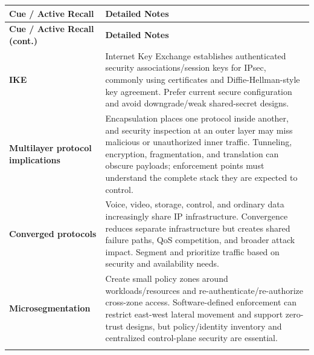 \documentclass[10pt,letterpaper]{article}
\makeatletter
\newenvironment{cornell}{\rowcolors{2}{white}{notebg}\begin{longtable}{@{}>{\raggedright\arraybackslash\columncolor{cuebg}\color{navy}\bfseries}p{0.285\textwidth}>{\raggedright\arraybackslash}p{0.65\textwidth}@{}}\rowcolor{navy}\color{white}\textbf{Cue / Active Recall} & \color{white}\textbf{Detailed Notes}\\ \hline\endfirsthead\rowcolor{navy}\color{white}\textbf{Cue / Active Recall (cont.)} & \color{white}\textbf{Detailed Notes}\\ \hline\endhead}{\end{longtable}}
\newcommand{\noterow}[2]{#1 & #2\\\arrayrulecolor{line}\hline}\newcommand{\source}[1]{\par{\footnotesize\color{teal}\textit{Source: CBK, #1}}\par}
\makeatother
\begin{document}
\begin{cornell}
\noterow{IKE}{Internet Key Exchange establishes authenticated security associations/session keys for IPsec, commonly using certificates and Diffie-Hellman-style key agreement. Prefer current secure configuration and avoid downgrade/weak shared-secret designs.}
\noterow{Multilayer protocol implications}{Encapsulation places one protocol inside another, and security inspection at an outer layer may miss malicious or unauthorized inner traffic. Tunneling, encryption, fragmentation, and translation can obscure payloads; enforcement points must understand the complete stack they are expected to control.}
\noterow{Converged protocols}{Voice, video, storage, control, and ordinary data increasingly share IP infrastructure. Convergence reduces separate infrastructure but creates shared failure paths, QoS competition, and broader attack impact. Segment and prioritize traffic based on security and availability needs.}
\noterow{Microsegmentation}{Create small policy zones around workloads/resources and re-authenticate/re-authorize cross-zone access. Software-defined enforcement can restrict east-west lateral movement and support zero-trust designs, but policy/identity inventory and centralized control-plane security are essential.}
\end{cornell}
\end{document}
